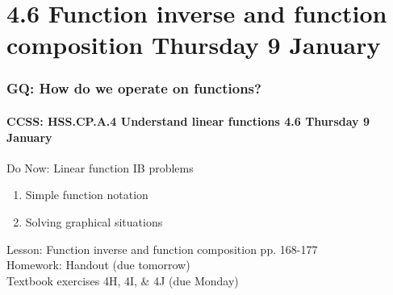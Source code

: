 \documentclass{beamer}
\begin{document}
\section{4.6 Function inverse and function composition Thursday 9 January}
\frame
{
  \frametitle{GQ: How do we operate on functions?}
  \framesubtitle{CCSS: HSS.CP.A.4 Understand linear functions \hfill \alert{4.6 Thursday 9 January}}

  \begin{block}{Do Now: Linear function IB problems}
  \begin{enumerate}
      \item Simple function notation
      \item Solving graphical situations
  \end{enumerate}
  \end{block}
  Lesson: Function inverse and function composition pp. 168-177 \\ \smallskip
  Homework: Handout (due tomorrow)\\
  Textbook exercises 4H, 4I, \& 4J (due Monday)
}
\end{document}
